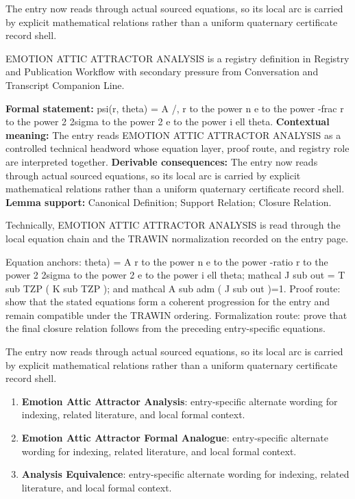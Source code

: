 The entry now reads through actual sourced equations, so its local arc is carried by explicit mathematical relations rather than a uniform quaternary certificate record shell.
\clearpage


\begingroup\small
{}
EMOTION ATTIC ATTRACTOR ANALYSIS is a registry definition in Registry and Publication Workflow with secondary pressure from Conversation and Transcript Companion Line.

\begingroup\footnotesize\setlength{\emergencystretch}{3em}\sloppy
\textbf{Formal statement:} psi(r, theta) = A /, r to the power n e to the power -frac r to the power 2 2sigma to the power 2 e to the power i ell theta. \textbf{Contextual meaning:} The entry reads EMOTION ATTIC ATTRACTOR ANALYSIS as a controlled technical headword whose equation layer, proof route, and registry role are interpreted together. \textbf{Derivable consequences:} The entry now reads through actual sourced equations, so its local arc is carried by explicit mathematical relations rather than a uniform quaternary certificate record shell. \textbf{Lemma support:} Canonical Definition; Support Relation; Closure Relation.\par
\endgroup

Technically, EMOTION ATTIC ATTRACTOR ANALYSIS is read through the local equation chain and the TRAWIN normalization recorded on the entry page.

Equation anchors: theta) = A r to the power n e to the power -ratio r to the power 2 2sigma to the power 2 e to the power i ell theta; mathcal J sub out = T sub TZP ( K sub TZP ); and mathcal A sub adm ( J sub out )=1. Proof route: show that the stated equations form a coherent progression for the entry and remain compatible under the TRAWIN ordering. Formalization route: prove that the final closure relation follows from the preceding entry-specific equations.

The entry now reads through actual sourced equations, so its local arc is carried by explicit mathematical relations rather than a uniform quaternary certificate record shell.
\endgroup

\begin{enumerate}[leftmargin=1.6em,itemsep=6pt,topsep=4pt]
\item \textbf{Emotion Attic Attractor Analysis}: entry-specific alternate wording for indexing, related literature, and local formal context.
\item \textbf{Emotion Attic Attractor Formal Analogue}: entry-specific alternate wording for indexing, related literature, and local formal context.
\item \textbf{Analysis Equivalence}: entry-specific alternate wording for indexing, related literature, and local formal context.
\end{enumerate}

